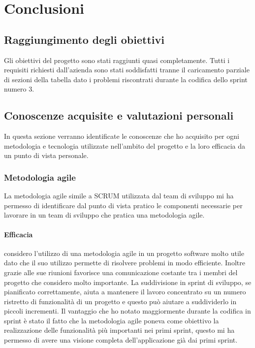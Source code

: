 
\chapter{Conclusioni}
\label{cap:conclusioni}
\section{Raggiungimento degli obiettivi}
Gli obiettivi del progetto sono stati raggiunti quasi completamente. Tutti i requisiti richiesti dall'azienda sono stati soddisfatti tranne il caricamento parziale di sezioni della tabella dato i problemi riscontrati durante la codifica dello sprint numero 3.

\section{Conoscenze acquisite e valutazioni personali}
In questa sezione verranno identificate le conoscenze che ho acquisito per ogni metodologia e tecnologia utilizzate nell'ambito del progetto e la loro efficacia da un punto di vista personale.

\subsection{Metodologia agile}
La metodologia agile simile a SCRUM utilizzata dal team di sviluppo mi ha permesso di identificare dal punto di vista pratico le componenti necessarie per lavorare in un team di sviluppo che pratica una metodologia agile.

\subsubsection*{Efficacia}
considero l'utilizzo di una metodologia agile in un progetto software molto utile dato che il suo utilizzo permette di risolvere problemi in modo efficiente. Inoltre grazie alle sue riunioni favorisce una comunicazione costante tra i membri del progetto che considero molto importante. La suddivisione in sprint di sviluppo, se pianificato correttamente, aiuta a mantenere il lavoro concentrato su un numero ristretto di funzionalità di un progetto e questo può aiutare a suddividerlo in piccoli incrementi. Il vantaggio che ho notato maggiormente durante la codifica in sprint è stato il fatto che la metodologia agile poneva come obiettivo la realizzazione delle funzionalità più importanti nei primi sprint, questo mi ha permesso di avere una visione completa dell'applicazione già dai primi sprint.

